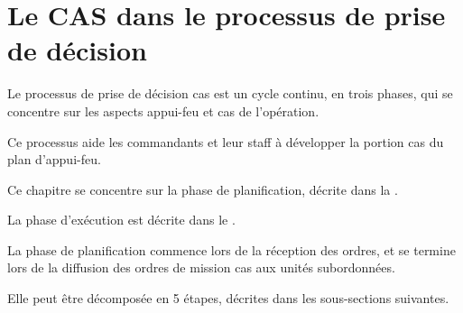\section{Le CAS dans le processus de prise de décision}

Le processus de prise de décision \gls{cas} est un cycle continu, en trois phases, qui se concentre sur les aspects appui-feu et \gls{cas} de l'opération.

Ce processus aide les commandants et leur staff à développer la portion \gls{cas} du plan d'appui-feu.

Ce chapitre se concentre sur la phase de planification, décrite dans la .

La phase d'exécution est décrite dans le .




La phase de planification commence lors de la réception des ordres, et se termine lors de la diffusion des ordres de mission \gls{cas} aux unités subordonnées.

Elle peut être décomposée en 5 étapes, décrites dans les sous-sections suivantes.

